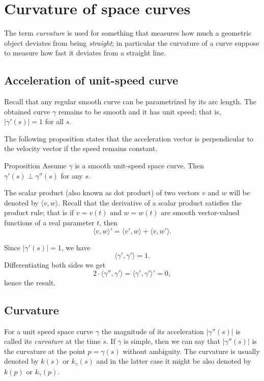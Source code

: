 \chapter{Curvature of space curves}


The term \emph{curvature} is used for something that measures how much 
a geometric object deviates from being \emph{straight};
in particular the curvature of a curve suppose to measure how fast it deviates from a straight line.

\section*{Acceleration of unit-speed curve}

Recall that any regular smooth curve can be parametrized by its arc length.
The obtained curve $\gamma$ remains to be smooth and it has unit speed; 
that is, $|\gamma'(s)|=1$ for all $s$.

The following proposition states that the acceleration vector is perpendicular to the velocity vector if the speed remains constant.

\begin{thm}{Proposition}\label{prop:a'-pertp-a''}
Assume $\gamma$ is a smooth unit-speed space curve.
Then $\gamma'(s)\perp \gamma''(s)$ for any $s$.
\end{thm}

The scalar product (also known as dot product) of two vectors $v$ and $w$ will be denoted by $\langle v,w\rangle$.
Recall that the derivative of a scalar product satisfies the product rule;
that is if $v=v(t)$ and $w=w(t)$ are smooth vector-valued functions of a real parameter $t$, then
\[\langle v,w\rangle'=\langle v',w\rangle+\langle v,w'\rangle.\]

Since $|\gamma'(s)|=1$, we have
\[\langle\gamma',\gamma'\rangle=1.\]
Differentiating both sides we get
\[2\cdot\langle\gamma'',\gamma'\rangle=\langle\gamma',\gamma'\rangle'=0,\]
hence the result.
\qeds

\section*{Curvature}

For a unit speed space curve $\gamma$ the magnitude of its acceleration $|\gamma''(s)|$ is called its \emph{curvature} at the time $s$.
If $\gamma$ is simple, then we can say that $|\gamma''(s)|$ is the curvature at the point $p=\gamma(s)$ without ambiguity.
The curvature is usually denoted by $k(s)$ or $k_\gamma(s)$ and in the latter case it might be also denoted by $k(p)$ or $k_\gamma(p)$.

